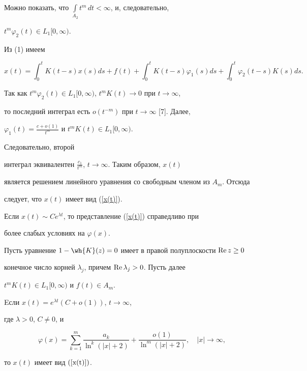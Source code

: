 Можно показать, что ${\int\limits_{A_2}t^m\,dt<\infty}$, и, следовательно,


$t^m\varphi_2(t)\in L_1[0,\infty)$.


Из (1) имеем


$$


x(t)=\int_0^t K(t-s) x(s) ds+f(t)+\int_0^t K(t-s)\varphi_1(s)


ds+\int_0^t \varphi_2(t-s)K(s)ds.


$$


Так как $t^m\varphi_2(t)\in L_1[0,\infty)$, $t^m K(t)\to0$ при $t\to\infty$,


то последний интеграл есть $o(t^{-m})$ при $t\to\infty$ [7]. Далее,


$\varphi_1(t)=\frac{c+o(1)}{t^m}$ и $t^m K(t)\in L_1[0,\infty)$.


Следовательно, второй


интеграл эквивалентен $\frac{c_1}{t^m}$, $t\to\infty$. Таким образом, $x(t)$


является решением линейного уравнения со свободным членом из $A_m$. Отсюда


следует, что $x(t)$ имеет вид (\ref{x(t)}).


Если $x(t)\sim Ce^{\lambda t}$, то представление (\ref{x(t)}) справедливо при


более слабых условиях на $\varphi(x)$.





\begin{thm}


Пусть уравнение $1-\wh{K}(z)=0$ имеет в правой полуплоскости $\operatorname{Re} z \ge 0$


конечное число корней $\lambda_j$, причем $\operatorname{Re}\lambda_j>0$. Пусть далее


${t^m K(t)\in L_1[0,\infty)}$ и $f(t)\in A_m$.





Eсли $x(t)=e^{\lambda t} ( C+o(1))$, $t \to \infty$,


где $\lambda > 0$, $C \ne 0$, и


$$


\varphi(x)=\sum_{k=1}^m \frac{a_k}{\ln^k ( |x|+2)}+ \frac{o(1)}


{\ln^m ( |x|+2 )},\quad |x| \to \infty,


$$


то $x(t)$ имеет вид $(\ref{x(t)})$.


\end{thm}





